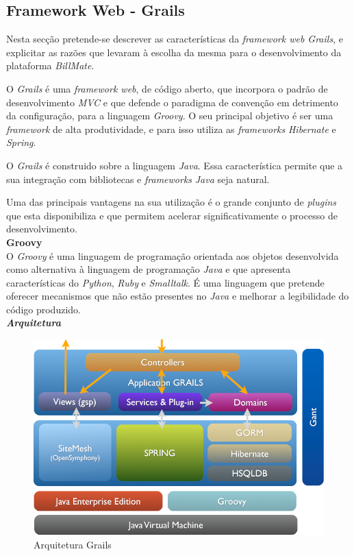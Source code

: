 \subsection{Framework Web - Grails} 

Nesta secção pretende-se descrever as características da \textit{framework web Grails}, e explicitar as razões que levaram à escolha da mesma para o desenvolvimento da plataforma \textit{BillMate}.

O \textit{Grails} é uma \textit{framework web}, de código aberto, que incorpora o padrão de desenvolvimento \textit{MVC} e que defende o paradigma de convenção em detrimento da configuração, para a linguagem \textit{Groovy}. O seu principal objetivo é ser uma \textit{framework} de alta produtividade, e para isso utiliza as \textit{frameworks} \textit{Hibernate} e \textit{Spring}. 

O \textit{Grails} é construido sobre a linguagem \textit{Java}. Essa característica permite que a sua integração com bibliotecas e \textit{frameworks} \textit{Java} seja natural.

Uma das principais vantagens na sua utilização é o grande conjunto de \textit{plugins} que esta disponibiliza e que permitem acelerar significativamente o processo de desenvolvimento.\\

\textbf{\large{Groovy}}\\

O \textit{Groovy} é uma linguagem de programação orientada aos objetos desenvolvida como alternativa à linguagem de programação \textit{Java} e que apresenta características do \textit{Python}, \textit{Ruby} e \textit{Smalltalk}. É uma linguagem que pretende oferecer mecanismos que não estão presentes no \textit{Java} e melhorar a legibilidade do código produzido.\\

\textbf{\textit{Arquitetura}}\\

\begin{figure}[ht]
\centerline{\includegraphics[width=.5\textwidth]{images/implementation/architecture_grails}}
\caption{Arquitetura Grails}
\label{fig:arqgrails}
\end{figure}

